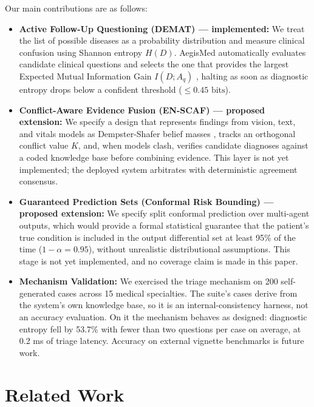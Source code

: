 \documentclass[10pt,twocolumn]{article}
\begin{document}
Our main contributions are as follows:
\begin{itemize}
    \item \textbf{Active Follow-Up Questioning (DEMAT) — implemented:} We treat the list of possible diseases as a probability distribution and measure clinical confusion using Shannon entropy $H(D)$. AegisMed automatically evaluates candidate clinical questions and selects the one that provides the largest Expected Mutual Information Gain $I(D; A_q)$ \cite{shannon1948mathematical}, halting as soon as diagnostic entropy drops below a confident threshold ($\le 0.45\text{ bits}$).
    \item \textbf{Conflict-Aware Evidence Fusion (EN-SCAF) — proposed extension:} We specify a design that represents findings from vision, text, and vitals models as Dempster-Shafer belief masses \cite{dempster1967upper, shafer1976mathematical}, tracks an orthogonal conflict value $K$, and, when models clash, verifies candidate diagnoses against a coded knowledge base before combining evidence. This layer is not yet implemented; the deployed system arbitrates with deterministic agreement consensus.
    \item \textbf{Guaranteed Prediction Sets (Conformal Risk Bounding) — proposed extension:} We specify split conformal prediction \cite{vovk2005algorithmic, angelopoulos2021gentle} over multi-agent outputs, which would provide a formal statistical guarantee that the patient's true condition is included in the output differential set at least 95\% of the time ($1 - \alpha = 0.95$), without unrealistic distributional assumptions. This stage is not yet implemented, and no coverage claim is made in this paper.
    \item \textbf{Mechanism Validation:} We exercised the triage mechanism on 200 self-generated cases across 15 medical specialties. The suite's cases derive from the system's own knowledge base, so it is an internal-consistency harness, not an accuracy evaluation. On it the mechanism behaves as designed: diagnostic entropy fell by 53.7\% with fewer than two questions per case on average, at 0.2 ms of triage latency. Accuracy on external vignette benchmarks is future work.
\end{itemize}

\section{Related Work}
\end{document}

